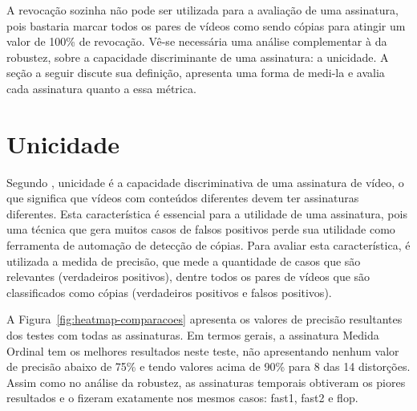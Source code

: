 
A revocação sozinha não pode ser utilizada para a avaliação de uma assinatura, pois bastaria marcar todos os pares de vídeos como sendo cópias para atingir um valor de 100\% de revocação. Vê-se necessária uma análise complementar à da robustez, sobre a capacidade discriminante de uma assinatura: a unicidade. A seção a seguir discute sua definição, apresenta uma forma de medi-la e avalia cada assinatura quanto a essa métrica.

\section{Unicidade}

Segundo , unicidade é a capacidade discriminativa de uma assinatura de vídeo, o que significa que vídeos com conteúdos diferentes devem ter assinaturas diferentes. Esta característica é essencial para a utilidade de uma assinatura, pois uma técnica que gera muitos casos de falsos positivos perde sua utilidade como ferramenta de automação de detecção de cópias. Para avaliar esta característica, é utilizada a medida de precisão, que mede a quantidade de casos que são relevantes (verdadeiros positivos), dentre todos os pares de vídeos que são classificados como cópias (verdadeiros positivos e falsos positivos)\cite{Ting2010}.


A Figura~\ref{fig:heatmap-comparacoes} apresenta os valores de precisão resultantes dos testes com todas as assinaturas. Em termos gerais, a assinatura Medida Ordinal tem os melhores resultados neste teste, não apresentando nenhum valor de precisão abaixo de 75\% e tendo valores acima de 90\% para 8 das 14 distorções. Assim como no análise da robustez, as assinaturas temporais obtiveram os piores resultados e o fizeram exatamente nos mesmos casos: fast1, fast2 e flop. 

